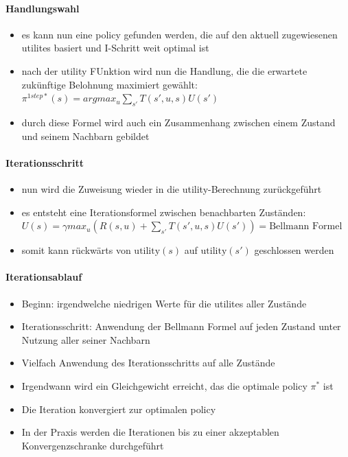 \paragraph{Handlungswahl}
\begin{itemize}
	\item es kann nun eine policy gefunden werden, die auf den aktuell zugewiesenen utilites basiert und I-Schritt weit optimal ist
	\item nach der utility FUnktion wird nun die Handlung, die die erwartete zuk\"unftige Belohnung maximiert gew\"ahlt: $\pi^{1step*}(s) = argmax_u \sum_{s'} T(s', u, s) U(s')$
	\item durch diese Formel wird auch ein Zusammenhang zwischen einem Zustand und seinem Nachbarn gebildet
\end{itemize}

\paragraph{Iterationsschritt}
\begin{itemize}
	\item nun wird die Zuweisung wieder in die utility-Berechnung zur\"uckgef\"uhrt
	\item es entsteht eine Iterationsformel zwischen benachbarten Zust\"anden:
	$U(s) = \gamma max_u (R(s,u) + \sum_{s'} T(s', u, s) U(s')) = \text{Bellmann Formel}$
	\item somit kann r\"uckw\"arts von $\text{utility}(s)$ auf $\text{utility}(s')$ geschlossen werden
\end{itemize}

\paragraph{Iterationsablauf}
\begin{itemize}
	\item Beginn: irgendwelche niedrigen Werte f\"ur die utilites aller Zust\"ande
	\item Iterationsschritt: Anwendung der Bellmann Formel auf jeden Zustand unter Nutzung aller seiner Nachbarn
	\item Vielfach Anwendung des Iterationsschritts auf alle Zust\"ande
	\item Irgendwann wird ein Gleichgewicht erreicht, das die optimale policy $\pi^*$ ist
	\item Die Iteration konvergiert zur optimalen policy
	\item In der Praxis werden die Iterationen bis zu einer akzeptablen Konvergenzschranke durchgef\"uhrt
\end{itemize}

